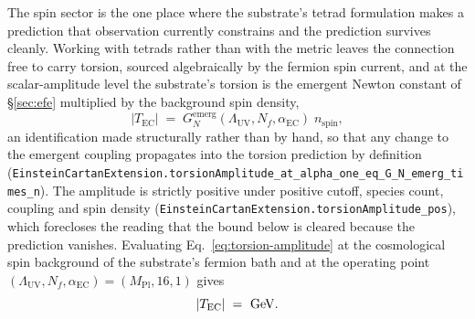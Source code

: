 \documentclass[aps,prd,nofootinbib,superscriptaddress,12pt]{revtex4-2}
\DeclareRobustCommand{\lb}{\discretionary{}{}{}}
\begin{document}
The spin sector is the one place where the substrate's tetrad formulation makes
a prediction that observation currently constrains and the prediction survives
cleanly. Working with tetrads rather than with the metric leaves the connection
free to carry torsion, sourced algebraically by the fermion spin current, and at
the scalar-amplitude level the substrate's torsion is the emergent Newton
constant of \S\ref{sec:efe} multiplied by the background spin density,
\begin{equation}
\label{eq:torsion-amplitude}
|T_{\mathrm{EC}}| \;=\; G_N^{\mathrm{emerg}}(\Lambda_{\mathrm{UV}}, N_f,
\alpha_{\mathrm{EC}})\; n_{\mathrm{spin}} ,
\end{equation}
an identification made structurally rather than by hand, so that any change to
the emergent coupling propagates into the torsion prediction by definition
(\texttt{Einstein\lb{}Cartan\lb{}Extension.\lb{}torsion\lb{}Amplitude\_\lb{}at\_\lb{}alpha\_\lb{}one\_\lb{}eq\_\lb{}G\_\lb{}N\_\lb{}emerg\_\lb{}times\_\lb{}n}).
The amplitude is strictly positive under positive cutoff, species count,
coupling and spin density
(\texttt{Einstein\lb{}Cartan\lb{}Extension.\lb{}torsion\lb{}Amplitude\_\lb{}pos}), which forecloses the
reading that the bound below is cleared because the prediction vanishes.
Evaluating Eq.~\eqref{eq:torsion-amplitude} at the cosmological spin background
of the substrate's fermion bath and at the operating point
$(\Lambda_{\mathrm{UV}}, N_f, \alpha_{\mathrm{EC}}) = (M_{\mathrm{Pl}}, 16, 1)$
gives
\begin{equation}
\label{eq:torsion-value}
|T_{\mathrm{EC}}| \;=\;
\unskip\ \mathrm{GeV}.
\end{equation}
\end{document}
